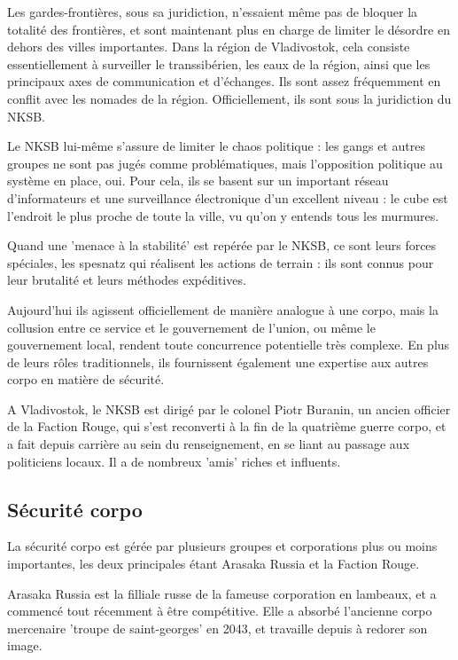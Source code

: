\documentclass[10pt,a4paper]{book}
\begin{document}
Les gardes-frontières, sous sa juridiction, n'essaient même pas de bloquer la totalité des frontières, et sont maintenant plus en charge de limiter le désordre en dehors des villes importantes. Dans la région de Vladivostok, cela consiste essentiellement à surveiller le transsibérien, les eaux de la région, ainsi que les principaux axes de communication et d'échanges. Ils sont assez fréquemment en conflit avec les nomades de la région. Officiellement, ils sont sous la juridiction du NKSB.

Le NKSB lui-même s'assure de limiter le chaos politique : les gangs et autres groupes ne sont pas jugés comme problématiques, mais l'opposition politique au système en place, oui. Pour cela, ils se basent sur un important réseau d'informateurs et une surveillance électronique d'un excellent niveau : le cube est l'endroit le plus proche de toute la ville, vu qu'on y entends tous les murmures.

Quand une 'menace à la stabilité' est repérée par le NKSB, ce sont leurs forces spéciales, les spesnatz qui réalisent les actions de terrain : ils sont connus pour leur brutalité et leurs méthodes expéditives. 

Aujourd'hui ils agissent officiellement de manière analogue à une corpo, mais la collusion entre ce service et le gouvernement de l'union, ou même le gouvernement local, rendent toute concurrence potentielle très complexe. En plus de leurs rôles traditionnels, ils fournissent également une expertise aux autres corpo en matière de sécurité.

A Vladivostok, le NKSB est dirigé par le colonel Piotr Buranin, un ancien officier de la Faction Rouge, qui s'est reconverti à la fin de la quatrième guerre corpo, et a fait depuis carrière au sein du renseignement, en se liant au passage aux politiciens locaux. Il a de nombreux 'amis' riches et influents.
\subsection{Sécurité corpo}
La sécurité corpo est gérée par plusieurs groupes et corporations plus ou moins importantes, les deux principales étant Arasaka Russia et la Faction Rouge.

Arasaka Russia est la filliale russe de la fameuse corporation en lambeaux, et a commencé tout récemment à être compétitive. Elle a absorbé l'ancienne corpo mercenaire 'troupe de saint-georges' en 2043, et travaille depuis à redorer son image.
\end{document}
